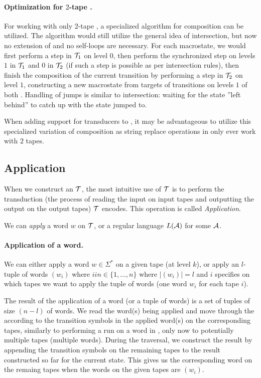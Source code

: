 \paragraph{Optimization for $2$-tape \nfts.}
For working with only $2$-tape \nfts, a specialized algorithm for composition can be utilized.
The algorithm would still utilize the general idea of \nft intersection, but now no extension of \nfts and no self-loops are necessary.
For each macrostate, we would first perform a step in $\mathcal{T}_1$ on level $0$, then perform the synchronized step on levels $1$ in $\mathcal{T}_1$ and $0$ in $\mathcal{T}_2$ (if such a step is possible as per \nft intersection rules), then finish the composition of the current transition by performing a step in $\mathcal{T}_2$ on level $1$, constructing a new macrostate from targets of transitions on levels $1$ of both \nfts.
Handling of jumps is similar to \nft intersection: waiting for the state ''left behind'' to catch up with the state jumped to.

When adding support for transducers to \noodler, it may be advantageous to utilize this specialized variation of composition as string replace operations in \noodler only ever work with $2$ tapes.

\subsection{Application}

When we construct an \nft $\mathcal{T}$, the most intuitive use of $\mathcal{T}$ is to perform the transduction (the process of reading the input on input tapes and outputting the output on the output tapes) $\mathcal{T}$ encodes.
This operation is called \emph{Application}.

We can \emph{apply} a word $w$ on $\mathcal{T}$, or a regular language $L(\mathcal{A})$ for some $\mathcal{A}$.

\paragraph{Application of a word.}
We can either apply a word $w \in \Sigma^*$ on a given tape (at level $k$), or apply an $l$-tuple of words $(w_i)$ where $i in \in \{ 1, \ldots, n \}$ where $|(w_i)| = l$ and $i$ specifies on which tapes we want to apply the tuple of words (one word $w_i$ for each tape $i$).

The result of the application of a word (or a tuple of words) is a set of tuples of size $(n - l)$ of words.
We read the word(s) being applied and move through the \nft according to the transition symbols in the applied word(s) on the corresponding tapes, similarly to performing a run on a word in \nfa, only now to potentially multiple tapes (multiple words).
During the traversal, we construct the result by appending the transition symbols on the remaining tapes to the result constructed so far for the current state.
This gives us the corresponding word on the remaing tapes when the words on the given tapes are $(w_i)$.

